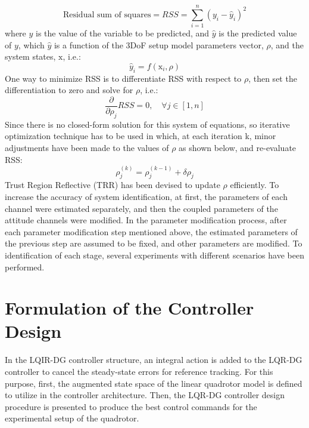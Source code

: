 \documentclass[3p,times]{elsarticle}
\begin{document}
\begin{equation}
    \text{Residual sum of squares} = RSS = \sum_{i=1}^{n} \left(y_i - \hat y_i \right)^2
\end{equation}
where $y$ is the value of the variable to be predicted, and $ \hat y$ is the predicted value of  $y$, which $\hat y$ is a function of the 3DoF setup model parameters vector, $\rho$,  and the system states, $\boldsymbol{{\mathrm{x}}}$, i.e.:
\begin{equation}
    \hat y_i = f(\boldsymbol{{\mathrm{x}}}_i, \rho)
\end{equation}
One way to minimize RSS is to differentiate RSS with respect to $\rho$, then set the differentiation to zero and solve for  $\rho$,  i.e.:
\begin{equation}
    \dfrac{\partial }{\partial \rho_j} RSS = 0, \quad \forall j \in [1, n]
\end{equation}
Since there is no closed-form solution for this system of equations, so iterative optimization technique has to be used in which, at each iteration k, minor adjustments have been made to the values of  $\rho$ as shown below, and re-evaluate RSS:
\begin{equation}
    \rho_j^{(k)} = \rho_j^{(k-1)} + \delta \rho_j
\end{equation}
Trust Region Reflective (TRR) has been devised to update $\rho$ efficiently. To increase the accuracy of system identification, at first, the parameters of each channel were estimated separately, and then the coupled parameters of the attitude channels were modified. In the parameter modification process, after each parameter modification step mentioned above, the estimated parameters of the previous step are assumed to be fixed, and other parameters are modified. To identification of each stage, several experiments with different scenarios have been performed.

\section{Formulation of the Controller Design}\label{sec:controller}
\noindent In the LQIR-DG controller structure, an integral action is added to the LQR-DG controller to cancel the steady-state errors for reference tracking. For this purpose, first, the augmented state space of the linear quadrotor model is defined to utilize in the controller architecture. Then, the LQR-DG controller design procedure is presented to produce the best control commands for the experimental setup of the quadrotor.
\end{document}
